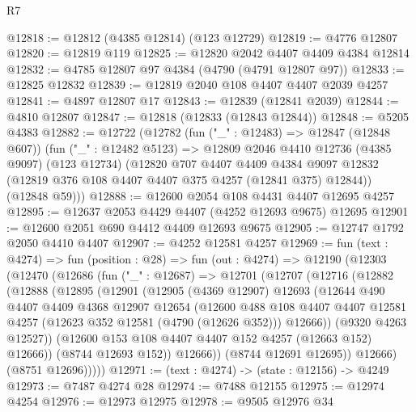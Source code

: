 \begin{lexlean}{R7}
\begin{coremodule}
@12818 := @12812 (@4385 @12814) (@123 @12729)
@12819 := @4776 @12807
@12820 := @12819 @119
@12825 := @12820 @2042 @4407 @4409 @4384 @12814
@12832 := @4785 @12807 @97 @4384 (@4790 (@4791 @12807 @97))
@12833 := @12825 @12832
@12839 := @12819 @2040 @108 @4407 @4407 @2039 @4257
@12841 := @4897 @12807 @17
@12843 := @12839 (@12841 @2039)
@12844 := @4810 @12807
@12847 := @12818 (@12833 (@12843 @12844))
@12848 := @5205 @4383
@12882 := @12722
    (@12782
      (fun ("_" : @12483) => @12847 (@12848 @607))
      (fun ("_" : @12482 @5123) =>
      @12809
        @2046
        @4410
        @12736
        (@4385 @9097)
        (@123 @12734)
        (@12820
          @707
          @4407
          @4409
          @4384
          @9097
          @12832
          (@12819 @376 @108 @4407 @4407 @375 @4257 (@12841 @375) @12844))
        (@12848 @59)))
@12888 := @12600 @2054 @108 @4431 @4407 @12695 @4257
@12895 := @12637 @2053 @4429 @4407 (@4252 @12693 @9675) @12695
@12901 := @12600 @2051 @690 @4412 @4409 @12693 @9675
@12905 := @12747 @1792 @2050 @4410 @4407
@12907 := @4252 @12581 @4257
@12969 := fun (text : @4274) =>
  fun (position : @28) =>
  fun (out : @4274) =>
  @12190
    (@12303
      (@12470
        (@12686
          (fun ("_" : @12687) =>
          @12701
            (@12707
              (@12716
                (@12882
                  (@12888
                    (@12895
                      (@12901
                        (@12905
                          (@4369 @12907)
                          @12693
                          (@12644
                            @490
                            @4407
                            @4409
                            @4368
                            @12907
                            @12654
                            (@12600
                              @488
                              @108
                              @4407
                              @4407
                              @12581
                              @4257
                              (@12623 @352 @12581 (@4790 (@12626 @352)))
                              @12666))
                          (@9320 @4263 @12527))
                        (@12600 @153 @108 @4407 @4407 @152 @4257 (@12663 @152) @12666))
                      (@8744 @12693 @152))
                    @12666))
                (@8744 @12691 @12695))
              @12666)
            (@8751 @12696)))))
@12971 := (text : @4274) -> (state : @12156) -> @4249
@12973 := @7487 @4274 @28
@12974 := @7488 @12155
@12975 := @12974 @4254
@12976 := @12973 @12975
@12978 := @9505 @12976 @34

\end{coremodule}
\end{lexlean}
